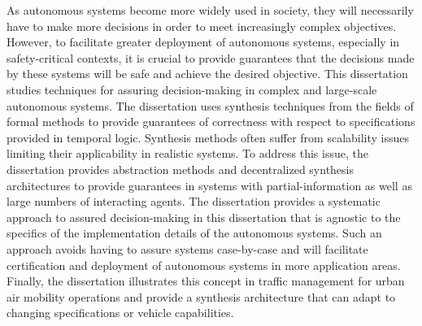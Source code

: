 \documentclass[12pt]{report}	%
\theoremstyle{definition}
\theoremstyle{remark}
\begin{document}
As autonomous systems become more widely used in society, they will necessarily have to make more decisions in order to meet increasingly complex objectives. However, to facilitate greater deployment of autonomous systems, especially in safety-critical contexts, it is crucial to provide guarantees that the decisions made by these systems will be safe and achieve the desired objective. This dissertation studies techniques for assuring decision-making in complex and large-scale autonomous systems. The dissertation uses synthesis techniques from the fields of formal methods to provide guarantees of correctness with respect to specifications provided in temporal logic. Synthesis methods often suffer from scalability issues limiting their applicability in realistic systems. To address this issue, the dissertation provides abstraction methods and decentralized synthesis architectures to provide guarantees in systems with partial-information as well as large numbers of interacting agents. The dissertation provides a systematic approach to assured decision-making in this dissertation that is agnostic to the specifics of the implementation details of the autonomous systems. Such an approach avoids having to assure systems case-by-case and will facilitate certification and deployment of autonomous systems in more application areas. Finally, the dissertation illustrates this concept in traffic management for urban air mobility operations and provide a synthesis architecture that can adapt to changing specifications or vehicle capabilities. 

\tableofcontents   %

\listoftables      %
\listoffigures     %



%
%
\end{document}
